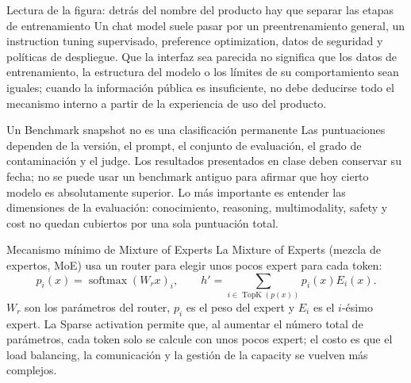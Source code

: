 
\begin{knowledgebox}{Lectura de la figura: detrás del nombre del producto hay que separar las etapas de entrenamiento}
Un chat model suele pasar por un preentrenamiento general, un instruction tuning supervisado, preference optimization, datos de seguridad y políticas de despliegue. Que la interfaz sea parecida no significa que los datos de entrenamiento, la estructura del modelo o los límites de su comportamiento sean iguales; cuando la información pública es insuficiente, no debe deducirse todo el mecanismo interno a partir de la experiencia de uso del producto.
\end{knowledgebox}


\begin{warningbox}{Un Benchmark snapshot no es una clasificación permanente}
Las puntuaciones dependen de la versión, el prompt, el conjunto de evaluación, el grado de contaminación y el judge. Los resultados presentados en clase deben conservar su fecha; no se puede usar un benchmark antiguo para afirmar que hoy cierto modelo es absolutamente superior. Lo más importante es entender las dimensiones de la evaluación: conocimiento, reasoning, multimodality, safety y cost no quedan cubiertos por una sola puntuación total.
\end{warningbox}



\begin{importantbox}{Mecanismo mínimo de Mixture of Experts}
La Mixture of Experts (mezcla de expertos, MoE) usa un router para elegir unos pocos expert para cada token:
\[
p_i(x)=\operatorname{softmax}(W_rx)_i,\qquad
h'=\sum_{i\in\operatorname{TopK}(p(x))}p_i(x)E_i(x).
\]
$W_r$ son los parámetros del router, $p_i$ es el peso del expert y $E_i$ es el $i$-ésimo expert. La Sparse activation permite que, al aumentar el número total de parámetros, cada token solo se calcule con unos pocos expert; el costo es que el load balancing, la comunicación y la gestión de la capacity se vuelven más complejos.
\end{importantbox}

